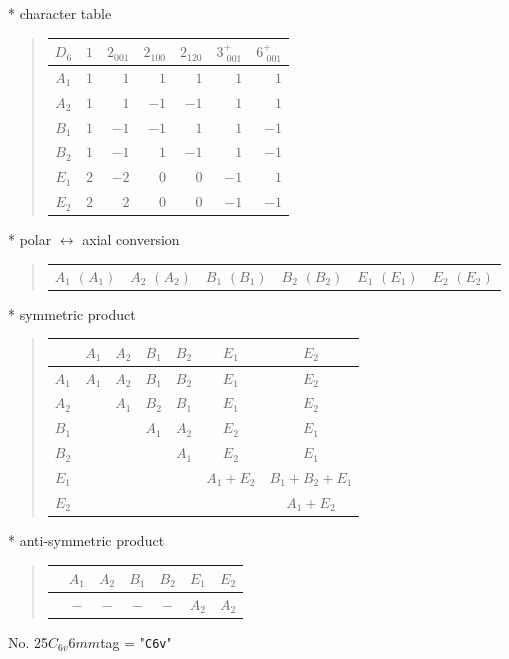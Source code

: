 \documentclass[fleqn,10pt,landscape]{jsarticle}
\begin{document}
* character table
\begin{quote}
\begin{tabular}{crrrrrr} \hline \hline
$ D_{6} $ & $ 1 $ & $ 2{}_{001} $ & $ 2{}_{100} $ & $ 2{}_{120} $ & $ 3^{+}_{\,\,001} $ & $ 6^{+}_{\,\,001} $ \\ \hline
$ A_{1} $ & $ 1 $ & $ 1 $ & $ 1 $ & $ 1 $ & $ 1 $ & $ 1 $ \\
$ A_{2} $ & $ 1 $ & $ 1 $ & $ -1 $ & $ -1 $ & $ 1 $ & $ 1 $ \\
$ B_{1} $ & $ 1 $ & $ -1 $ & $ -1 $ & $ 1 $ & $ 1 $ & $ -1 $ \\
$ B_{2} $ & $ 1 $ & $ -1 $ & $ 1 $ & $ -1 $ & $ 1 $ & $ -1 $ \\
$ E_{1} $ & $ 2 $ & $ -2 $ & $ 0 $ & $ 0 $ & $ -1 $ & $ 1 $ \\
$ E_{2} $ & $ 2 $ & $ 2 $ & $ 0 $ & $ 0 $ & $ -1 $ & $ -1 $ \\
 \hline \hline
\end{tabular}
\end{quote}
* polar $\leftrightarrow$ axial conversion
\begin{quote}
\begin{tabular}{cccccc}
$ A_{1}\,\,(A_{1}) $ & $ A_{2}\,\,(A_{2}) $ & $ B_{1}\,\,(B_{1}) $ & $ B_{2}\,\,(B_{2}) $ & $ E_{1}\,\,(E_{1}) $ & $ E_{2}\,\,(E_{2}) $
\end{tabular}
\end{quote}
* symmetric product
\begin{quote}
\begin{tabular}{c|cccccc} \hline \hline
 & $ A_{1} $ & $ A_{2} $ & $ B_{1} $ & $ B_{2} $ & $ E_{1} $ & $ E_{2} $ \\ \hline
$ A_{1} $ & $ A_{1} $ & $ A_{2} $ & $ B_{1} $ & $ B_{2} $ & $ E_{1} $ & $ E_{2} $ \\
$ A_{2} $ & $  $ & $ A_{1} $ & $ B_{2} $ & $ B_{1} $ & $ E_{1} $ & $ E_{2} $ \\
$ B_{1} $ & $  $ & $  $ & $ A_{1} $ & $ A_{2} $ & $ E_{2} $ & $ E_{1} $ \\
$ B_{2} $ & $  $ & $  $ & $  $ & $ A_{1} $ & $ E_{2} $ & $ E_{1} $ \\
$ E_{1} $ & $  $ & $  $ & $  $ & $  $ & $ A_{1} + E_{2} $ & $ B_{1} + B_{2} + E_{1} $ \\
$ E_{2} $ & $  $ & $  $ & $  $ & $  $ & $  $ & $ A_{1} + E_{2} $ \\
 \hline \hline
\end{tabular}
\end{quote}
* anti-symmetric product
\begin{quote}
\begin{tabular}{ccccccc} \hline \hline
 & $ A_{1} $ & $ A_{2} $ & $ B_{1} $ & $ B_{2} $ & $ E_{1} $ & $ E_{2} $ \\ \hline
$  $ & $ - $ & $ - $ & $ - $ & $ - $ & $ A_{2} $ & $ A_{2} $ \\
 \hline \hline
\end{tabular}
\end{quote}
\newpage
No. 25\quad$C_{6v}$\quad$6mm$\quad[ hexagonal ]
tag = "{\tt C6v}"
\end{document}
